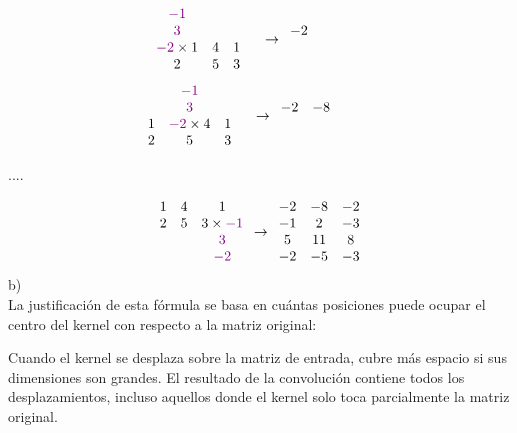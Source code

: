 \documentclass[11pt]{article}
\begin{document}
\[
\begin{array}{cccccccc}
    \textcolor{violet}{-1} \\ 
    \textcolor{violet}{3} \\
    \textcolor{violet}{-2} \times 1 & 4 & 1 \\ 
     2 & 5 & 3 & \\ 
\end{array}
\rightarrow
\begin{array}{ccccc}
    -2 &  &  & &  \\
     &  &  & &  \\
\end{array}
\]
\[
\begin{array}{cccccccc}
    &\textcolor{violet}{-1} \\ 
    &\textcolor{violet}{3} \\
    1&\textcolor{violet}{-2} \times 4 &  1 \\ 
     2 & 5 & 3 & \\ 
\end{array}
\rightarrow
\begin{array}{ccccc}
    -2 & -8 &  & &  \\
     &  &  & &  \\
\end{array}
\] 
\begin{center}
    ....
\end{center}
\[
\begin{array}{cccccccc}
    1& 4 &  1 \\ 
    2 & 5 & 3 \times \textcolor{violet}{-1} \\
    && \textcolor{violet}{3}  \\
    && \textcolor{violet}{-2}  \\
\end{array}
\rightarrow
\begin{array}{ccc}
    -2 & -8 & -2 \\
    -1 & 2 & -3 \\
    5 & 11 & 8 \\
    -2 & -5 & -3 \\
\end{array}
\] 
b) \\ 

La justificación de esta fórmula se basa en cuántas posiciones puede ocupar el centro del kernel con respecto a la matriz original:

Cuando el kernel se desplaza sobre la matriz de entrada, cubre más espacio si sus dimensiones son grandes.
El resultado de la convolución contiene todos los desplazamientos, incluso aquellos donde el kernel solo toca parcialmente la matriz original.
\end{document}
